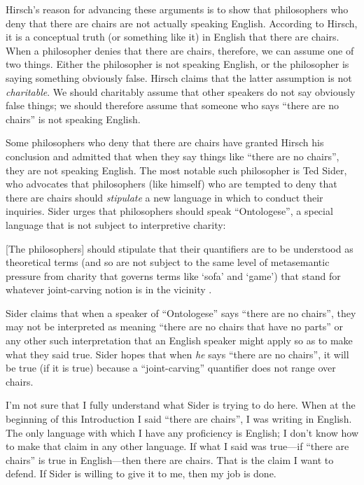 \documentclass[11pt]{article}
\newenvironment{squote}{%
\begin{spacing}{1}
       	\begin{list}{}{%
\setlength{\labelwidth}{0pt}%
\rightmargin\leftmargin%
}
\item\relax
}{%
\end{list}%
\end{spacing}
}
\begin{document}
\begin{spacing}{1.25}
Hirsch's reason for advancing these arguments is to show that
philosophers who deny that there are chairs are not actually speaking
English.  According to Hirsch, it is a conceptual truth (or something
like it) in English that there are chairs.  When a philosopher denies
that there are chairs, therefore, we can assume one of two things.
Either the philosopher is not speaking English, or the philosopher is
saying something obviously false.  Hirsch claims that the latter
assumption is not {\em charitable}.  We should charitably assume that
other speakers do not say obviously false things; we should therefore
assume that someone who says ``there are no chairs'' is not speaking
English.

Some philosophers who deny that there are chairs have granted Hirsch
his conclusion and admitted that when they say things like ``there are
no chairs'', they are not speaking English.  The most notable such
philosopher is Ted Sider, who advocates that philosophers (like
himself) who are tempted to deny that there are chairs should {\em
  stipulate} a new language in which to conduct their inquiries.
Sider urges that philosophers should speak ``Ontologese'', a special
language that is not subject to interpretive charity:

\begin{squote}
{[}The philosophers{]} should stipulate that their quantifiers are to be
understood as theoretical terms (and so are not subject to the same
level of metasemantic pressure from charity that governs terms like
`sofa' and `game') that stand for whatever joint-carving notion is in
the vicinity \citeyearpar[9]{sider2011b}.
\end{squote}

Sider claims that when a speaker of ``Ontologese'' says ``there are no
chairs'', they may not be interpreted as meaning ``there are no chairs
that have no parts'' or any other such interpretation that an English
speaker might apply so as to make what they said true.  Sider hopes
that when {\em he} says ``there are no chairs'', it will be true (if
it is true) because a ``joint-carving'' quantifier does not range over
chairs.

I'm not sure that I fully understand what Sider is trying to do here.
When at the beginning of this Introduction I said ``there are
chairs'', I was writing in English.  The only language with which I
have any proficiency is English; I don't know how to make that claim
in any other language.  If what I said was true---if ``there are
chairs'' is true in English---then there are chairs.  That is the
claim I want to defend.  If Sider is willing to give it to me, then my
job is done.


\end{spacing}
\end{document}
